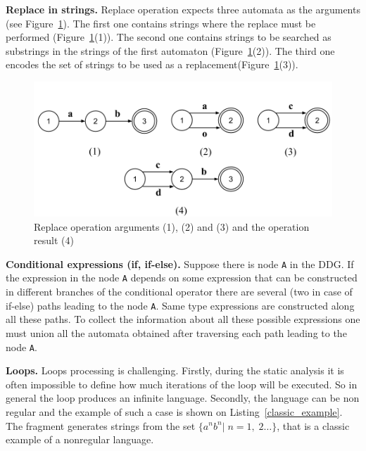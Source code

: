 \documentclass{sig-alternate-05-2015}
\begin{document}
\textbf{Replace in strings.} Replace operation expects three automata as the arguments (see Figure~\ref{replace_pic}). The first one contains strings where the replace must be performed (Figure~\ref{replace_pic}(1)). The second one contains strings to be searched as substrings in the strings of the first automaton (Figure~\ref{replace_pic}(2)). The third one encodes the set of strings to be used as a replacement(Figure~\ref{replace_pic}(3)).

\begin{figure}[h!]
    \begin{center}
        \includegraphics[scale=0.3]{Figures/automata_replace.png}
    \end{center}
    \caption{Replace operation arguments (1), (2) and (3) and the operation result (4)}
    \label{replace_pic}
\end{figure} 

\textbf{Conditional expressions (if, if-else).} Suppose there is node \verb|A| in the DDG. If the expression in the node \verb|A| depends on some expression that can be constructed in different branches of the conditional operator there are several (two in case of if-else) paths leading to the node \verb|A|. Same type expressions are constructed along all these paths. To collect the information about all these possible expressions one must union all the automata obtained after traversing each path leading to the node \verb|A|.

\textbf{Loops.} Loops processing is challenging. Firstly, during the static analysis it is often impossible to define how much iterations of the loop will be executed. So in general the loop produces an infinite language. Secondly, the language can be non regular and the example of such a case is shown on Listing~\ref{classic_example}. The fragment generates strings from the set $\{ a^nb^n |\; n = 1,\; 2 \ldots \}$, that is a classic example of a nonregular language.
\end{document}
